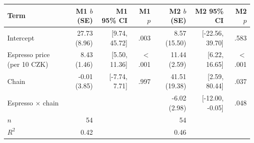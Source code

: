 \begin{tabular}{lrrrrrr}
\toprule
Term & M1 $b$ (SE) & M1 95\% CI & M1 $p$ & M2 $b$ (SE) & M2 95\% CI & M2 $p$ \\
\midrule
Intercept & 27.73 (8.96) & [9.74, 45.72] & .003 & 8.57 (15.50) & [-22.56, 39.70] & .583 \\
Espresso price (per 10 CZK) & 8.43 (1.46) & [5.50, 11.36] & $<$.001 & 11.44 (2.59) & [6.22, 16.65] & $<$.001 \\
Chain & -0.01 (3.85) & [-7.74, 7.71] & .997 & 41.51 (19.38) & [2.59, 80.44] & .037 \\
Espresso $\times$ chain &  &  &  & -6.02 (2.98) & [-12.00, -0.05] & .048 \\
$n$ & 54 &  &  & 54 &  &  \\
$R^2$ & 0.42 &  &  & 0.46 &  &  \\
\bottomrule
\end{tabular}
